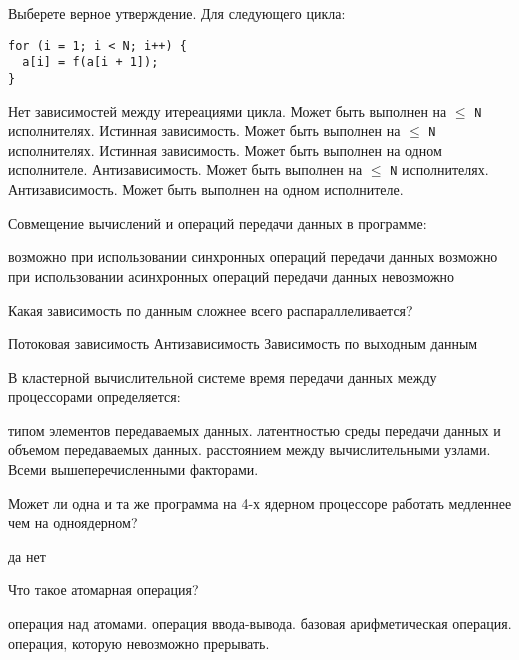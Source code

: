 \documentclass[a4paper, 12pt, addpoints]{exam}
\begin{document}
\begin{questions}
\question[1] Выберете верное утверждение. Для следующего цикла:
\begin{lstlisting}
for (i = 1; i < N; i++) {
  a[i] = f(a[i + 1]);
}
\end{lstlisting}
\begin{choices}
    \choice Нет зависимостей между итереациями цикла. Может быть выполнен на $\leq$ \texttt{N} исполнителях.
    \choice Истинная зависимость. Может быть выполнен на $\leq$ \texttt{N} исполнителях.
    \choice Истинная зависимость. Может быть выполнен на одном исполнителе.
    \correctchoice Антизависимость. Может быть выполнен на $\leq$ \texttt{N} исполнителях.
    \choice Антизависимость. Может быть выполнен на одном исполнителе.
\end{choices}

\question[1] Совмещение вычислений и операций передачи данных в программе:
\begin{choices}
    \choice возможно при использовании синхронных операций передачи данных
    \correctchoice возможно при использовании асинхронных операций передачи данных
    \choice невозможно
\end{choices}

\question[1] Какая зависимость по данным сложнее всего распараллеливается?
\begin{choices}
    \correctchoice Потоковая зависимость
    \choice Антизависимость
    \choice Зависимость по выходным данным
\end{choices}

\question[1] В кластерной вычислительной системе время передачи данных между процессорами определяется:
\begin{choices}
    \choice типом элементов передаваемых данных.
    \correctchoice латентностью среды передачи данных и объемом передаваемых данных.
    \choice расстоянием между вычислительными узлами.
    \choice Всеми вышеперечисленными факторами.
\end{choices}

\question[1] Может ли одна и та же программа на 4-х ядерном процессоре работать медленнее чем на одноядерном?
\begin{choices}
    \correctchoice да
    \choice нет
\end{choices}

\question[1] Что такое атомарная операция?
\begin{choices}
    \choice операция над атомами.
    \choice операция ввода-вывода.
    \choice базовая арифметическая операция.
    \correctchoice операция, которую невозможно прерывать.
\end{choices}


\end{questions}
\end{document}
